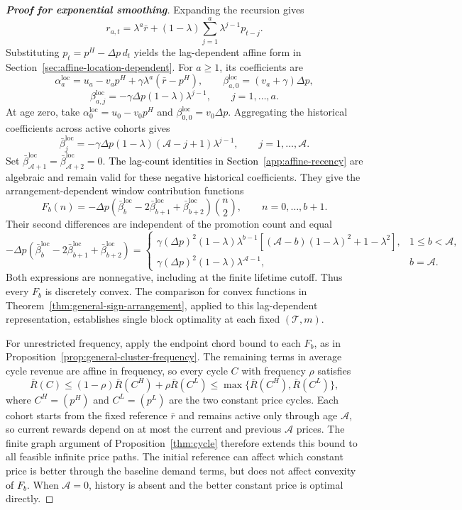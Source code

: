 \begin{proof}[\normalfont\bfseries Proof for exponential smoothing]
Expanding the recursion gives
\[
 r_{a,t}=\lambda^a\bar r+
 (1-\lambda)\sum_{j=1}^{a}\lambda^{j-1}p_{t-j}.
\]
Substituting \(p_t=p^H-\Delta p\,d_t\) yields the lag-dependent affine form in Section~\ref{sec:affine-location-dependent}. For \(a\ge1\), its coefficients are
\[
 \alpha_a^{\mathrm{loc}}
 =u_a-v_ap^H+\gamma\lambda^a(\bar r-p^H),\qquad
 \beta_{a,0}^{\mathrm{loc}}=(v_a+\gamma)\Delta p,
\]
\[
 \beta_{a,j}^{\mathrm{loc}}
 =-\gamma\Delta p(1-\lambda)\lambda^{j-1},
 \qquad j=1,\ldots,a.
\]
At age zero, take \(\alpha_0^{\mathrm{loc}}=u_0-v_0p^H\) and \(\beta_{0,0}^{\mathrm{loc}}=v_0\Delta p\). Aggregating the historical coefficients across active cohorts gives
\[
 \bar\beta_j^{\mathrm{loc}}
 =-\gamma\Delta p(1-\lambda)
   (\mathcal A-j+1)\lambda^{j-1},
 \qquad j=1,\ldots,\mathcal A.
\]
Set \(\bar\beta_{\mathcal A+1}^{\mathrm{loc}}=\bar\beta_{\mathcal A+2}^{\mathrm{loc}}=0\). \textcolor{black}{The lag-count identities in Section~\ref{app:affine-recency}} are algebraic and remain valid for these negative historical coefficients. They give the arrangement-dependent window contribution functions
\[
 F_b(n)=-\Delta p\left(
 \bar\beta_b^{\mathrm{loc}}-2\bar\beta_{b+1}^{\mathrm{loc}}
 +\bar\beta_{b+2}^{\mathrm{loc}}\right)\binom n2,
 \qquad n=0,\ldots,b+1.
\]
Their second differences are independent of the promotion count and equal
\[
 -\Delta p\left(
 \bar\beta_b^{\mathrm{loc}}-2\bar\beta_{b+1}^{\mathrm{loc}}
 +\bar\beta_{b+2}^{\mathrm{loc}}\right)
 =\begin{cases}
 \gamma(\Delta p)^2(1-\lambda)\lambda^{b-1}
 \left[(\mathcal A-b)(1-\lambda)^2+1-\lambda^2\right],
    &1\le b<\mathcal A,\\[4pt]
 \gamma(\Delta p)^2(1-\lambda)\lambda^{\mathcal A-1},
    &b=\mathcal A.
 \end{cases}
\]
Both expressions are nonnegative, including at the finite lifetime cutoff. Thus every \(F_b\) is discretely convex. The comparison for convex functions in Theorem~\ref{thm:general-sign-arrangement}, applied to this lag-dependent representation, establishes single block optimality at each fixed \((\mathcal T,m)\).

For unrestricted frequency, apply the endpoint chord bound to each \(F_b\), as in Proposition~\ref{prop:general-cluster-frequency}. The remaining terms in average cycle revenue are affine in frequency, so every cycle \(C\) with frequency \(\rho\) satisfies
\[
 \bar R(C)\le(1-\rho)\bar R(C^H)+\rho\bar R(C^L)
 \le\max\{\bar R(C^H),\bar R(C^L)\},
\]
where \(C^H=(p^H)\) and \(C^L=(p^L)\) are the two constant price cycles. Each cohort starts from the fixed reference \(\bar r\) and remains active only through age \(\mathcal A\), so current rewards depend on at most the current and previous \(\mathcal A\) prices. The finite graph argument of Proposition~\ref{thm:cycle} therefore extends this bound to all feasible infinite price paths. The initial reference can affect which constant price is better through the baseline demand terms, but does not affect \textcolor{black}{convexity of \(F_b\)}. When \(\mathcal A=0\), history is absent and the better constant price is optimal directly.
\end{proof}

